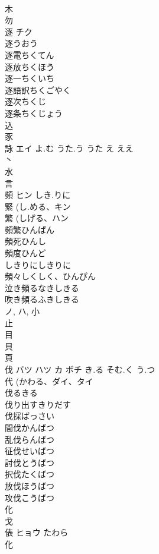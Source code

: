 \documentclass[8pt]{extreport}
\begin{document}
\begin{CJK}{UTF8}{min}
\\	木 
\\	勿 
\\	逐	チク		
\\	逐うおう 
\\	逐電ちくてん 
\\	逐放ちくほう 
\\	逐一ちくいち 
\\	逐語訳ちくごやく 
\\	逐次ちくじ 
\\	逐条ちくじょう 
\\	込 
\\	豕 
\\	詠	エイ	よ.む うた.う うた え ええ	
\\	丶 
\\	水 
\\	言 
\\	頻	ヒン	しき.りに	
\\	緊 (し.める、キン 
\\	繁 (しげる、ハン 
\\	頻繁ひんぱん
\\	頻死ひんし
\\	頻度ひんど
\\	しきりにしきりに
\\	頻々しくしく、ひんぴん
\\	泣き頻るなきしきる
\\	吹き頻るふきしきる
\\	ノ, ハ, 小 
\\	止 
\\	目 
\\	貝 
\\	頁 
\\	伐	バツ ハツ カ ボチ	き.る そむ.く う.つ	
\\	代 (かわる、ダイ、タイ 
\\	伐るきる
\\	伐り出すきりだす
\\	伐採ばっさい
\\	間伐かんばつ
\\	乱伐らんばつ
\\	征伐せいばつ
\\	討伐とうばつ
\\	択伐たくばつ
\\	放伐ほうばつ
\\	攻伐こうばつ
\\	化 
\\	戈 
\\	俵	ヒョウ	たわら	
\\	化 

\end{CJK}
\end{document}
